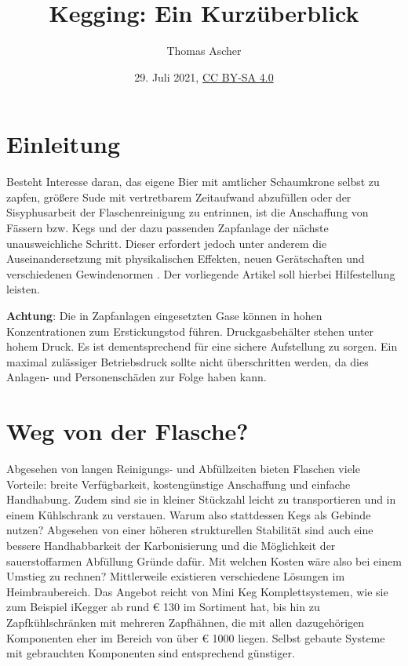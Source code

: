 \documentclass[a4paper,parskip=half]{scrartcl}
\title{Kegging: Ein Kurzüberblick}
\author{Thomas Ascher}
\date{29. Juli 2021, \href{http://creativecommons.org/licenses/by-sa/4.0/}{CC BY-SA 4.0}}
\begin{document}
\maketitle

\section*{Einleitung}

Besteht Interesse daran, das eigene Bier mit amtlicher Schaumkrone selbst zu zapfen, größere Sude mit vertretbarem Zeitaufwand abzufüllen oder der Sisyphusarbeit der Flaschenreinigung zu entrinnen, ist die Anschaffung von Fässern bzw. Kegs und der dazu passenden Zapfanlage der nächste unausweichliche Schritt. Dieser erfordert jedoch unter anderem die Auseinandersetzung mit physikalischen Effekten, neuen Gerätschaften und verschiedenen Gewindenormen \autocite{GastroBrennecke2021}. Der vorliegende Artikel soll hierbei Hilfestellung leisten.

\textbf{Achtung}: Die in Zapfanlagen eingesetzten Gase können in hohen Konzentrationen zum Erstickungstod führen. Druckgasbehälter stehen unter hohem Druck. Es ist dementsprechend für eine sichere Aufstellung zu sorgen. Ein maximal zulässiger Betriebsdruck sollte nicht überschritten werden, da dies Anlagen- und Personenschäden zur Folge haben kann.

\section*{Weg von der Flasche?}

Abgesehen von langen Reinigungs- und Abfüllzeiten bieten Flaschen viele Vorteile: breite Verfügbarkeit, kostengünstige Anschaffung und einfache Handhabung. Zudem sind sie in kleiner Stückzahl leicht zu transportieren und in einem Kühlschrank zu verstauen. Warum also stattdessen Kegs als Gebinde nutzen? Abgesehen von einer höheren strukturellen Stabilität sind auch eine bessere Handhabbarkeit der Karbonisierung und die Möglichkeit der sauerstoffarmen Abfüllung Gründe dafür. Mit welchen Kosten wäre also bei einem Umstieg zu
rechnen? Mittlerweile existieren verschiedene Lösungen im Heimbraubereich. Das
Angebot reicht von Mini Keg Komplettsystemen, wie sie zum Beispiel iKegger ab rund
€ 130 im Sortiment hat, bis hin zu Zapfkühlschränken mit mehreren Zapfhähnen,
die mit allen dazugehörigen Komponenten eher im Bereich von über € 1000 liegen.
Selbst gebaute Systeme mit gebrauchten Komponenten sind entsprechend günstiger.
\end{document}
